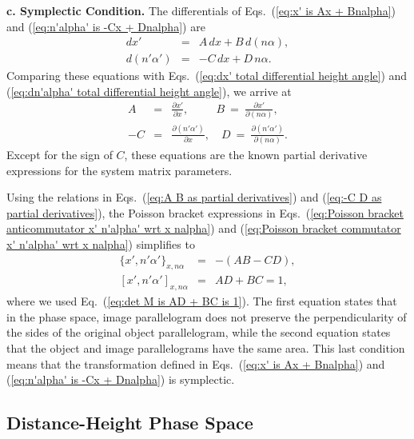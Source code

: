 \documentclass[11pt,twocolumn]{article}
\begin{document}
\textbf{c.  Symplectic Condition.}  The differentials of Eqs.~(\ref{eq:x' is Ax + Bnalpha}) and (\ref{eq:n'alpha' is -Cx + Dnalpha}) are
\begin{eqnarray}
\label{eq:dx' is A dx + B dnalpha}
dx'&=&A\,dx+B\,d(n\alpha),\\
\label{eq:dn'alpha' is -C dx + D dnalpha}
d(n'\alpha')&=&-C\,dx+D\,n\alpha.
\end{eqnarray}
Comparing these equations with Eqs.~(\ref{eq:dx' total differential height angle}) and (\ref{eq:dn'alpha' total differential height angle}), we arrive at
\begin{eqnarray}
\label{eq:A B as partial derivatives}
A &=&\frac{\partial x'}{\partial x},\qquad\ \ B\ =\ \frac{\partial x'}{\partial(n\alpha)},\\
\label{eq:-C D as partial derivatives}
-C &=&\frac{\partial (n'\alpha')}{\partial x},\quad D\ =\ \frac{\partial(n'\alpha')}{\partial(n\alpha)}.
\end{eqnarray}
Except for the sign of $C$, these equations are the known partial derivative expressions for the system matrix parameters.\cite{Stone_1997_josav14i12pp3415-3429_p3416}

Using the relations in Eqs.~(\ref{eq:A B as partial derivatives}) and (\ref{eq:-C D as partial derivatives}), the Poisson bracket expressions in Eqs.~(\ref{eq:Poisson bracket anticommutator x' n'alpha' wrt x nalpha}) and (\ref{eq:Poisson bracket commutator x' n'alpha' wrt x nalpha}) simplifies to
\begin{eqnarray}
\label{eq:Poisson bracket anticommutator is AB - CD}
\{x',n'\alpha'\}_{x,n\alpha}&=&-(AB-CD),\\
\label{eq:Poisson bracket commutator is AD+BC is 1}
[x',n'\alpha']_{x,n\alpha}&=&AD+BC=1,
\end{eqnarray}
where we used Eq.~(\ref{eq:det M is AD + BC is 1}).  The first equation states that in the phase space, image parallelogram does not preserve the perpendicularity of the sides of the original object parallelogram, while the second equation states that the object and image parallelograms have the same area.  This last condition means that the transformation defined in Eqs.~(\ref{eq:x' is Ax + Bnalpha}) and (\ref{eq:n'alpha' is -Cx + Dnalpha}) is symplectic.

\subsection{Distance-Height Phase Space}
\end{document}
